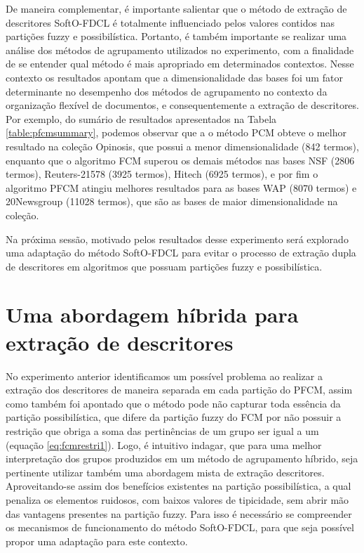 De maneira complementar, é importante salientar que o método de extração de descritores SoftO-FDCL é
totalmente influenciado pelos valores contidos nas partições fuzzy e possibilística. Portanto, é
também importante se realizar uma análise dos métodos de agrupamento utilizados no experimento, com
a finalidade de se entender qual método é mais apropriado em determinados contextos. Nesse contexto
os resultados apontam que a dimensionalidade das bases foi um fator determinante no desempenho dos
métodos de agrupamento no contexto da organização flexível de documentos, e consequentemente a
extração de descritores. Por exemplo, do sumário de resultados apresentados na Tabela
\ref{table:pfcmsummary}, podemos observar que a o método PCM obteve o melhor resultado na coleção
Opinosis, que possui a menor dimensionalidade (842 termos), enquanto que o algoritmo FCM superou os
demais métodos nas bases NSF (2806 termos), Reuters-21578 (3925 termos), Hitech (6925 termos), e por
fim o algoritmo PFCM atingiu melhores resultados para as bases WAP (8070 termos) e 20Newsgroup
(11028 termos), que são as bases de maior dimensionalidade na coleção.

Na próxima sessão, motivado pelos resultados desse experimento será explorado uma adaptação do
método SoftO-FDCL para evitar o processo de extração dupla de descritores em algoritmos que possuam
partições fuzzy e possibilística.

\section{Uma abordagem híbrida para extração de descritores}

No experimento anterior identificamos um possível problema ao realizar a extração dos
descritores de maneira separada em cada partição do PFCM, assim como também foi apontado que o
método pode não capturar toda essência da partição possibilística, que difere da partição fuzzy do
FCM por não possuir a restrição que obriga a soma das pertinências de um grupo ser igual a um
(equação \ref{eq:fcmrestri1}).
Logo, é intuitivo indagar, que para uma melhor interpretação dos grupos produzidos em um método de
agrupamento híbrido, seja pertinente utilizar também uma abordagem mista de extração descritores.
Aproveitando-se assim dos benefícios existentes na partição possibilística, a qual penaliza os
elementos ruidosos, com baixos valores de tipicidade, sem abrir mão das vantagens presentes na
partição fuzzy. Para isso é necessário se compreender os mecanismos de funcionamento do método
SoftO-FDCL, para que seja possível propor uma adaptação para este contexto.

